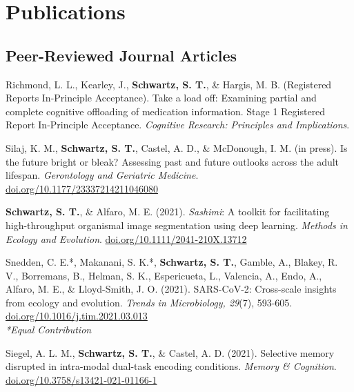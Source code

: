 \section*{Publications}
\subsection*{Peer-Reviewed Journal Articles}
Richmond, L. L., Kearley, J., \textbf{Schwartz, S. T.}, \& Hargis, M. B. (Registered Reports In-Principle Acceptance). Take a load off: Examining partial and complete cognitive offloading of medication information. Stage 1 Registered Report In-Principle Acceptance. \textit{Cognitive Research: Principles and Implications}.

\pubspace

Silaj, K. M., \textbf{Schwartz, S. T.}, Castel, A. D., \& McDonough, I. M. (in press). Is the future bright or bleak? Assessing past and future outlooks across the adult lifespan. \textit{Gerontology and Geriatric Medicine}. \textcolor{RoyalBlue}{\href{https://doi.org/10.1177/23337214211046080}{doi.org/10.1177/23337214211046080}}

\pubspace

\textbf{Schwartz, S. T.}, \& Alfaro, M. E. (2021). \textit{Sashimi}: A toolkit for facilitating high-throughput organismal image segmentation using deep learning. \textit{Methods in Ecology and Evolution}. \textcolor{RoyalBlue}{\href{https://doi.org/10.1111/2041-210X.13712}{doi.org/10.1111/2041-210X.13712}}

\pubspace

Snedden, C. E.*, Makanani, S. K.*, \textbf{Schwartz, S. T.}, Gamble, A., Blakey, R. V., Borremans, B., Helman, S. K., Espericueta, L., Valencia, A., Endo, A., Alfaro, M. E., \& Lloyd-Smith, J. O. (2021). SARS-CoV-2: Cross-scale insights from ecology and evolution. \textit{Trends in Microbiology, 29}(7), 593-605.\\
\textcolor{RoyalBlue}{\href{https://doi.org/10.1016/j.tim.2021.03.013}{doi.org/10.1016/j.tim.2021.03.013}}
\\ \textit{*Equal Contribution}

\pubspace

Siegel, A. L. M., \textbf{Schwartz, S. T.}, \& Castel, A. D. (2021). Selective memory disrupted in intra-modal dual-task encoding conditions. \textit{Memory \& Cognition}. \textcolor{RoyalBlue}{\href{https://doi.org/10.3758/s13421-021-01166-1}{doi.org/10.3758/s13421-021-01166-1}}


